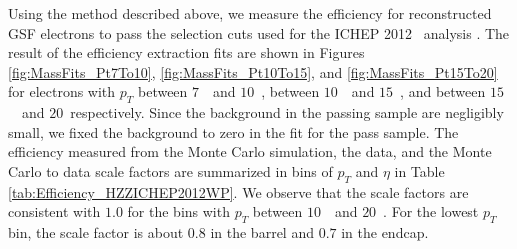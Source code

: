\documentclass{cmspaper}
\begin{document}
Using the method described above, we measure the efficiency for reconstructed GSF electrons to pass the 
selection cuts used for the ICHEP 2012 \HiggsToZZ\ analysis \cite{HZZICHEPCMSNote,HZZICHEPCaliforniaCMSNote}.
The result of the efficiency extraction fits are shown in Figures \ref{fig:MassFits_Pt7To10}, \ref{fig:MassFits_Pt10To15},
and \ref{fig:MassFits_Pt15To20} for electrons with $p_{T}$ between $7$~\GeV\ and $10$~\GeV, between $10$~\GeV\ and $15$~\GeV,
and between $15$~\GeV\ and $20$~\GeV respectively. Since the background in the passing sample are negligibly small, we
fixed the background to zero in the fit for the pass sample.  
The efficiency measured from the Monte Carlo simulation, the data, and the
Monte Carlo to data scale factors are summarized in bins of $p_{T}$ and $\eta$ in Table \ref{tab:Efficiency_HZZICHEP2012WP}.
We observe that the scale factors are consistent with $1.0$ for the bins with $p_{T}$ between $10$~\GeV\ and $20$~\GeV.
For the lowest $p_{T}$ bin, the scale factor is about $0.8$ in the barrel and $0.7$ in the endcap. 
\end{document}
